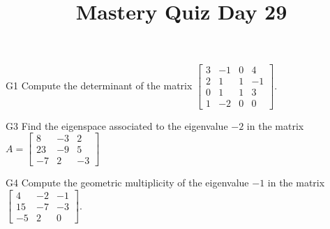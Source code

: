 \documentclass{sbgLAquiz}
\title{Mastery Quiz Day 29 }
\begin{document}
\begin{problem}{G1}
Compute the determinant of the matrix $\begin{bmatrix} 3 & -1 & 0 & 4 \\ 2 & 1 & 1& -1 \\ 0 & 1 & 1 & 3 \\ 1 & -2 & 0 & 0 \end{bmatrix}$.
\end{problem}

\begin{problem}{G3}
Find the eigenspace associated to the eigenvalue $-2$ in the matrix $A=\begin{bmatrix}8 & -3 & 2 \\ 23 & -9 & 5 \\ -7 & 2 & -3\end{bmatrix}$
\end{problem}
\newpage

\begin{problem}{G4}
Compute the geometric multiplicity of the eigenvalue $-1$ in the matrix $\begin{bmatrix} 4 & -2 & -1 \\ 15 & -7 & -3 \\ -5 & 2 & 0 \end{bmatrix}$.  
\end{problem}
\end{document}
